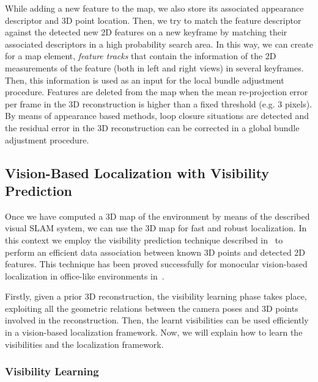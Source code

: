 While adding a new feature to the map, we also store its associated
appearance descriptor and 3D point location. Then, we try to match the
feature descriptor against the detected new 2D features on a new
keyframe by matching their associated descriptors in a high
probability search area. In this way, we can create for a map element,
\textit{feature tracks} that contain the information of the 2D
measurements of the feature (both in left and right views) in several
keyframes. Then, this information is used as an input for the local
bundle adjustment procedure. Features are deleted from the map when
the mean re-projection error per frame in the 3D reconstruction is
higher than a fixed threshold (e.g. 3 pixels). By means of appearance
based methods, loop closure situations are detected and the residual
error in the 3D reconstruction can be corrected in a global bundle
adjustment procedure.

\subsection{Vision-Based Localization with Visibility Prediction}\label{sec:vision_localization}

Once we have computed a 3D map of the environment by means of the
described visual SLAM system, we can use the 3D map for fast and
robust localization. In this context we employ the visibility
prediction technique described in~\cite{Alcantarilla11icra} to perform
an efficient data association between known 3D points and detected 2D
features. This technique has been proved successfully for monocular
vision-based localization in office-like environments
in~\cite{Alcantarilla10icra}.

Firstly, given a prior 3D reconstruction, the visibility learning
phase takes place, exploiting all the geometric relations between the
camera poses and 3D points involved in the reconstruction. Then, the
learnt visibilities can be used efficiently in a vision-based
localization framework. Now, we will explain how to learn the
visibilities and the localization framework.

\subsubsection{Visibility Learning}\label{sec:visibility}

